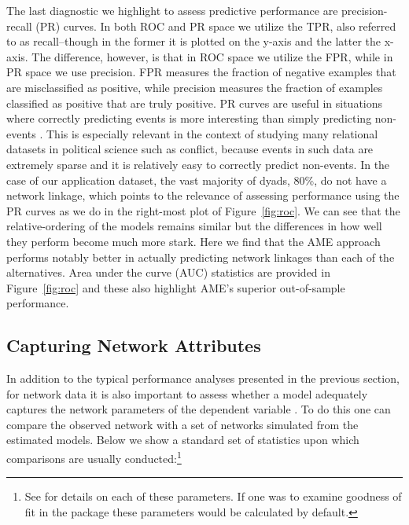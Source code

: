 The last diagnostic we highlight to assess predictive performance are precision-recall (PR) curves. In both ROC and PR space we utilize the TPR, also referred to as recall--though in the former it is plotted on the y-axis and the latter the x-axis. The difference, however, is that in ROC space we utilize the FPR, while in PR space we use precision. FPR measures the fraction of negative examples that are misclassified as positive, while precision measures the fraction of examples classified as positive that are truly positive. PR curves are useful in situations where correctly predicting events is more interesting than simply predicting non-events \citep{davis:goadrich:2006}. This is especially relevant in the context of studying many relational datasets in political science such as conflict, because events in such data are extremely sparse and it is relatively easy to correctly predict non-events. In the case of our application dataset, the vast majority of dyads, 80\%, do not have a network linkage, which points to the relevance of assessing performance using the PR curves as we do in the right-most plot of Figure~\ref{fig:roc}. We can see that the relative-ordering of the models remains similar but the differences in how well they perform become much more stark. Here we find that the AME approach performs notably better in actually predicting network linkages than each of the alternatives. Area under the curve (AUC) statistics are provided in Figure~\ref{fig:roc} and these also highlight AME's superior out-of-sample performance.

\subsection{Capturing Network Attributes}

In addition to the typical performance analyses presented in the previous section, for network data it is also important to assess whether a model adequately captures the network parameters of the dependent variable \citep{hunter:etal:2008}. To do this one can compare the observed network with a set of networks simulated from the estimated models. Below we show a standard set of statistics upon which comparisons are usually conducted:\footnote{See \citet{morris:etal:2008} for details on each of these parameters. If one was to examine goodness of fit in the  package these parameters would be calculated by default.}

